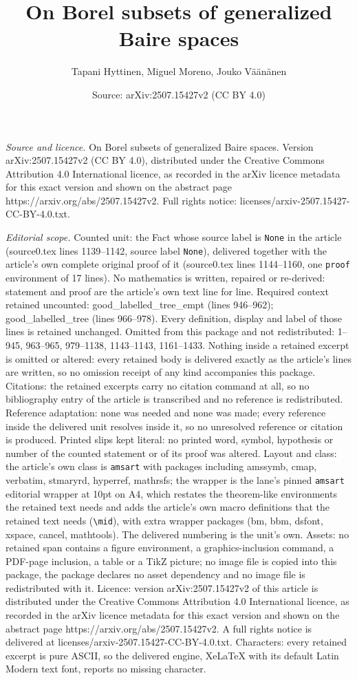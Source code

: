 \documentclass[10pt,a4paper]{amsart}
\title[On Borel subsets of generalized Baire spaces]{On Borel subsets of generalized Baire spaces}
\author{Tapani Hyttinen, Miguel Moreno, Jouko V\"a\"an\"anen}
\date{Source: arXiv:2507.15427v2 (CC BY 4.0)}
\begin{document}
\maketitle

\noindent\emph{Source and licence.} On Borel subsets of generalized Baire spaces. Version arXiv:2507.15427v2 (CC BY 4.0), distributed under the Creative Commons Attribution 4.0 International licence, as recorded in the arXiv licence metadata for this exact version and shown on the abstract page https://arxiv.org/abs/2507.15427v2. Full rights notice: licenses/arxiv-2507.15427-CC-BY-4.0.txt.\par\smallskip

\noindent\textit{Editorial scope.} Counted unit: the Fact whose source label is \texttt{None} in the article (source0.tex lines 1139--1142, source label \texttt{None}), delivered together with the article's own complete original proof of it (source0.tex lines 1144--1160, one \texttt{proof} environment of 17 lines). No mathematics is written, repaired or re-derived: statement and proof are the article's own text line for line. Required context retained uncounted: good\_labelled\_tree\_empt (lines 946--962); good\_labelled\_tree (lines 966--978). Every definition, display and label of those lines is retained unchanged. Omitted from this package and not redistributed: 1--945, 963--965, 979--1138, 1143--1143, 1161--1433. Nothing inside a retained excerpt is omitted or altered: every retained body is delivered exactly as the article's lines are written, so no omission receipt of any kind accompanies this package. Citations: the retained excerpts carry no citation command at all, so no bibliography entry of the article is transcribed and no reference is redistributed. Reference adaptation: none was needed and none was made; every reference inside the delivered unit resolves inside it, so no unresolved reference or citation is produced. Printed slips kept literal: no printed word, symbol, hypothesis or number of the counted statement or of its proof was altered. Layout and class: the article's own class is \texttt{amsart} with packages including amssymb, cmap, verbatim, stmaryrd, hyperref, mathrsfs; the wrapper is the lane's pinned \texttt{amsart} editorial wrapper at 10pt on A4, which restates the theorem-like environments the retained text needs and adds the article's own macro definitions that the retained text needs (\texttt{\textbackslash mid}), with extra wrapper packages (bm, bbm, dsfont, xspace, cancel, mathtools). The delivered numbering is the unit's own. Assets: no retained span contains a figure environment, a graphics-inclusion command, a PDF-page inclusion, a table or a TikZ picture; no image file is copied into this package, the package declares no asset dependency and no image file is redistributed with it. Licence: version arXiv:2507.15427v2 of this article is distributed under the Creative Commons Attribution 4.0 International licence, as recorded in the arXiv licence metadata for this exact version and shown on the abstract page https://arxiv.org/abs/2507.15427v2. A full rights notice is delivered at licenses/arxiv-2507.15427-CC-BY-4.0.txt. Characters: every retained excerpt is pure ASCII, so the delivered engine, XeLaTeX with its default Latin Modern text font, reports no missing character.
\end{document}
